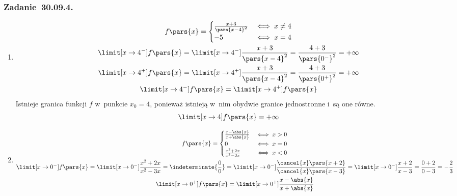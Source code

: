 \subsubsection*{Zadanie~30.09.4.}
\begin{enumerate}[label={\alph*)}]
    \addtocounter{enumi}{6}
    \item
        \begin{gather*}
            f\pars{x} = \begin{cases}
                \frac{x + 3}{\pars{x - 4}^2} & \iff x \neq 4\\
                -5 & \iff x = 4
            \end{cases}\\
            \limit[x \to 4^-] f\pars{x}
                = \limit[x \to 4^-] \frac{x + 3}{\pars{x - 4}^2}
                = \frac{4 + 3}{\pars{0^-}^2}
                = +\infty\\
            \limit[x \to 4^+] f\pars{x}
                = \limit[x \to 4^+] \frac{x + 3}{\pars{x - 4}^2}
                = \frac{4 + 3}{\pars{0^+}^2}
                = +\infty\\
            \limit[x \to 4^-] f\pars{x} = \limit[x \to 4^+] f\pars{x}
        \end{gather*}
        Istnieje granica funkcji \(f\) w~punkcie \(x_0 = 4\), ponieważ istnieją w~nim obydwie granice jednostronne i~są one równe.
        \begin{equation*}
            \limit[x \to 4] f\pars{x} = +\infty
        \end{equation*}
    \item
        \begin{gather*}
            f\pars{x} = \begin{cases}
                \frac{x - \abs{x}}{x + \abs{x}} & \iff x > 0\\
                0 & \iff x = 0\\
                \frac{x^2 + 2x}{x^2 - 3x} & \iff x < 0
            \end{cases}\\
            \limit[x \to 0^-] f\pars{x}
                = \limit[x \to 0^-] \frac{x^2 + 2x}{x^2 - 3x}
                = \indeterminate{\frac{0}{0}}
                = \limit[x \to 0^-] \frac{\cancel{x}\pars{x + 2}}{\cancel{x}\pars{x - 3}}
                = \limit[x \to 0^-] \frac{x + 2}{x - 3}
                = \frac{0 + 2}{0 - 3}
                = -\frac{2}{3}\\
            \limit[x \to 0^+] f\pars{x}
                = \limit[x \to 0^+] \frac{x - \abs{x}}{x + \abs{x}}

\end{gather*}
\end{enumerate}
